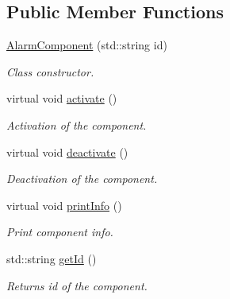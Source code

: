 \subsection*{Public Member Functions}
\begin{DoxyCompactItemize}
\item 
\hyperlink{classAlarmComponent_a4d10477bd20bbdb544e8a8ca8128add2}{Alarm\+Component} (std\+::string id)
\begin{DoxyCompactList}\small\item\em Class constructor. \end{DoxyCompactList}\item 
virtual void \hyperlink{classAlarmComponent_ab2acf6b580efe04bd617580ecb7323f1}{activate} ()\hypertarget{classAlarmComponent_ab2acf6b580efe04bd617580ecb7323f1}{}\label{classAlarmComponent_ab2acf6b580efe04bd617580ecb7323f1}

\begin{DoxyCompactList}\small\item\em Activation of the component. \end{DoxyCompactList}\item 
virtual void \hyperlink{classAlarmComponent_aef44069a068e92ccd15b3afcbd06dff6}{deactivate} ()\hypertarget{classAlarmComponent_aef44069a068e92ccd15b3afcbd06dff6}{}\label{classAlarmComponent_aef44069a068e92ccd15b3afcbd06dff6}

\begin{DoxyCompactList}\small\item\em Deactivation of the component. \end{DoxyCompactList}\item 
virtual void \hyperlink{classAlarmComponent_a51a7a6e0d85da344c741deddfcb7cff3}{print\+Info} ()\hypertarget{classAlarmComponent_a51a7a6e0d85da344c741deddfcb7cff3}{}\label{classAlarmComponent_a51a7a6e0d85da344c741deddfcb7cff3}

\begin{DoxyCompactList}\small\item\em Print component info. \end{DoxyCompactList}\item 
std\+::string \hyperlink{classAlarmComponent_a24595490fdeecfbdee852c6fa503786d}{get\+Id} ()\hypertarget{classAlarmComponent_a24595490fdeecfbdee852c6fa503786d}{}\label{classAlarmComponent_a24595490fdeecfbdee852c6fa503786d}

\begin{DoxyCompactList}\small\item\em Returns id of the component. \end{DoxyCompactList}\end{DoxyCompactItemize}
